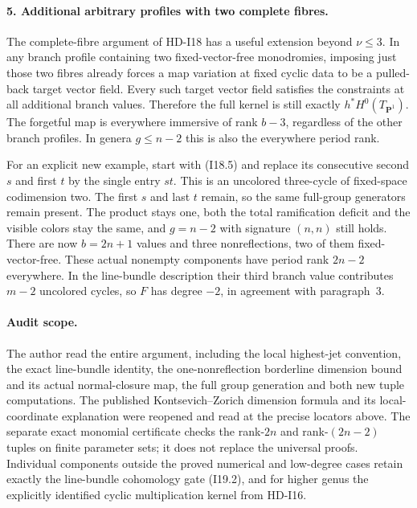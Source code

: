 \paragraph{5. Additional arbitrary profiles with two complete fibres.}
The complete-fibre argument of HD-I18 has a useful extension
beyond $\nu\leq3$. In any branch profile containing two
fixed-vector-free monodromies, imposing just those two fibres
already forces a map variation at fixed cyclic data to be a
pulled-back target vector field. Every such target vector field
satisfies the constraints at all additional branch values.
Therefore the full kernel is still exactly
$h^*H^0(T_{\mathbf P^1})$. The forgetful map is everywhere
immersive of rank $b-3$, regardless of the other branch
profiles. In genera $g\leq n-2$ this is also the everywhere
period rank.

For an explicit new example, start with (I18.5) and replace its
consecutive second $s$ and first $t$ by the single entry $st$.
This is an uncolored three-cycle of fixed-space codimension
two. The first $s$ and last $t$ remain, so the same full-group
generators remain present. The product stays one, both the
total ramification deficit and the visible colors stay the
same, and $g=n-2$ with signature $(n,n)$ still holds.
There are now $b=2n+1$ values and three nonreflections, two
of them fixed-vector-free. These actual nonempty components
have period rank $2n-2$ everywhere. In the line-bundle
description their third branch value contributes $m-2$
uncolored cycles, so $F$ has degree $-2$, in agreement with
paragraph~3.

\paragraph{Audit scope.}
The author read the entire argument, including the local
highest-jet convention, the exact line-bundle identity, the
one-nonreflection borderline dimension bound and its actual
normal-closure map, the full group generation and both new
tuple computations. The published Kontsevich--Zorich dimension
formula and its local-coordinate explanation were reopened
and read at the precise locators above. The separate exact
monomial certificate checks the rank-$2n$ and rank-$(2n-2)$
tuples on finite parameter sets; it does not replace the
universal proofs. Individual components outside the proved
numerical and low-degree cases retain exactly the line-bundle
cohomology gate (I19.2), and for higher genus the explicitly
identified cyclic multiplication kernel from HD-I16.
